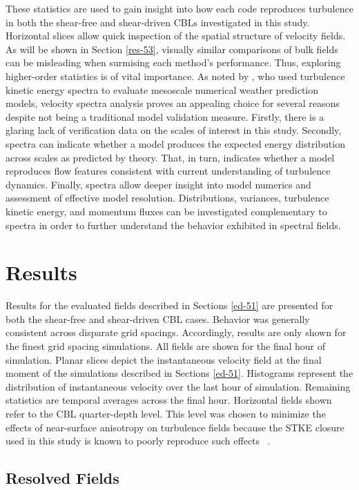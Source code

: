 These statistics are used to gain insight into how each code reproduces turbulence in both the shear-free and shear-driven CBLs investigated in this study. Horizontal slices allow quick inspection of the spatial structure of velocity fields. As will be shown in Section \autoref{res-53}, visually similar comparisons of bulk fields can be misleading when surmising each method's performance. Thus, exploring higher-order statistics is of vital importance. As noted by  \citet{Skamarock04}, who used turbulence kinetic energy spectra to evaluate mesoscale numerical weather prediction models, velocity spectra analysis proves an appealing choice for several reasons despite not being a traditional model validation measure. Firstly, there is a glaring lack of verification data on the scales of interest in this study. Secondly, spectra can indicate whether a model produces the expected energy distribution across scales as predicted by theory. That, in turn, indicates whether a model reproduces flow features consistent with current understanding of turbulence dynamics. Finally, spectra allow deeper insight into model numerics and assessment of effective model resolution. Distributions, variances, turbulence kinetic energy, and momentum fluxes can be investigated complementary to spectra in order to further understand the behavior exhibited in spectral fields.

\section{Results}
\label{res-53}

Results for the evaluated fields described in Sections \autoref{ed-51} are presented for both the shear-free and shear-driven CBL cases. Behavior was generally consistent across disparate grid spacings. Accordingly, results are only shown for the finest grid spacing simulations. All fields are shown for the final hour of simulation. Planar slices depict the instantaneous velocity field at the final moment of the simulations described in Sections \autoref{ed-51}. Histograms represent the distribution of instantaneous velocity over the last hour of simulation. Remaining statistics are temporal averages across the final hour. Horizontal fields shown refer to the CBL quarter-depth level. This level was chosen to minimize the effects of near-surface anisotropy on turbulence fields because the STKE closure used in this study is known to poorly reproduce such effects ~\citep{Kirkil2012}.

\subsection{Resolved Fields}
\label{resolve-531}

